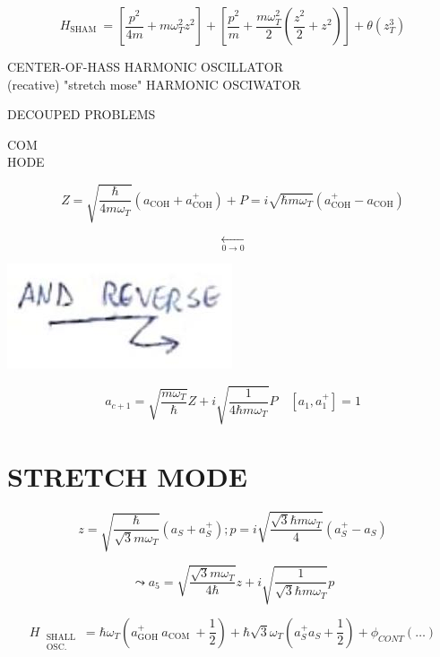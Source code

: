 \documentclass[10pt]{article}
\begin{document}
$$
H_{\text {SHAM }}=\left[\frac{p^{2}}{4 m}+m \omega_{T}^{2} z^{2}\right]+\left[\frac{p^{2}}{m}+\frac{m \omega_{T}^{2}}{2}\left(\frac{z^{2}}{2}+z^{2}\right)\right]+\theta\left(z_{T}^{3}\right)
$$

CENTER-OF-HASS HARMONIC OSCILLATOR\\
(recative) "stretch mose" HARMONIC OSCIWATOR

DECOUPED PROBLEMS

COM\\
HODE

$$
Z=\sqrt{\frac{\hbar}{4 m \omega_{T}}}\left(a_{\mathrm{COH}}+a_{\mathrm{COH}}^{+}\right)+P=i \sqrt{\hbar m \omega_{T}}\left(a_{\mathrm{COH}}^{+}-a_{\mathrm{COH}}\right)
$$

$$
\underset{0 \rightarrow 0}{\leftarrow}
$$

\begin{center}
\includegraphics[max width=\textwidth]{2025_10_16_f28de32ab20bd0ac9bbfg-3}
\end{center}

$$
a_{c+1}=\sqrt{\frac{m \omega_{T}}{\hbar}} Z+i \sqrt{\frac{1}{4 \hbar m \omega_{T}}} P \quad\left[a_{1}, a_{1}^{+}\right]=1
$$

\section*{STRETCH MODE}
$$
z=\sqrt{\frac{\hbar}{\sqrt{3} m \omega_{T}}}\left(a_{S}+a_{S}^{+}\right) ; p=i \sqrt{\frac{\sqrt{3} \hbar m \omega_{T}}{4}}\left(a_{S}^{+}-a_{S}\right)
$$

$$
\leadsto a_{5}=\sqrt{\frac{\sqrt{3} m \omega_{T}}{4 \hbar}} z+i \sqrt{\frac{1}{\sqrt{3} \hbar m \omega_{T}}} p
$$

$$
H_{\substack{\text { SHALL } \\ \text { OSC. }}}=\hbar \omega_{T}\left(a_{\text {GOH }}^{+} a_{\text {COM }}+\frac{1}{2}\right)+\hbar \sqrt{3} \omega_{T}\left(a_{S}^{+} a_{S}+\frac{1}{2}\right)+\phi_{C O N T}(\ldots)
$$
\end{document}
